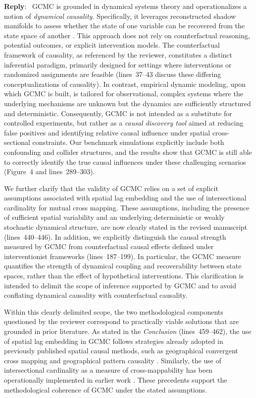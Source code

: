 \documentclass[11pt]{article}
\newcounter{reviewer}
\newenvironment{reply}
   {\medskip \noindent \color{blue} \begin{sf}\textbf{Reply}:\  }
   {\medskip \par \end{sf}}
\begin{document}
\begin{reply}
GCMC is grounded in dynamical systems theory and operationalizes a notion of \textit{dynamical causality}. Specifically, it leverages reconstructed shadow manifolds to assess whether the state of one variable can be recovered from the state space of another \citep{sugihara2012ccm,gao2023gccm,tao2023cmc}. This approach does not rely on counterfactual reasoning, potential outcomes, or explicit intervention models. The counterfactual framework of causality, as referenced by the reviewer, constitutes a distinct inferential paradigm, primarily designed for settings where interventions or randomized assignments are feasible (lines~37--43 discuss these differing conceptualizations of causality). In contrast, empirical dynamic modeling, upon which GCMC is built, is tailored for observational, complex systems where the underlying mechanisms are unknown but the dynamics are sufficiently structured and deterministic. Consequently, GCMC is not intended as a substitute for controlled experiments, but rather as a \textit{causal discovery tool} aimed at reducing false positives and identifying relative causal influence under spatial cross-sectional constraints. Our benchmark simulations explicitly include both confounding and collider structures, and the results show that GCMC is still able to correctly identify the true causal influences under these challenging scenarios (Figure~4 and lines~289--303).

We further clarify that the validity of GCMC relies on a set of explicit assumptions associated with spatial lag embedding and the use of intersectional cardinality for mutual cross mapping. These assumptions, including the presence of sufficient spatial variability and an underlying deterministic or weakly stochastic dynamical structure, are now clearly stated in the revised manuscript (lines~440--446). In addition, we explicitly distinguish the causal strength measured by GCMC from counterfactual causal effects defined under interventionist frameworks (lines~187--199). In particular, the GCMC measure quantifies the strength of dynamical coupling and recoverability between state spaces, rather than the effect of hypothetical interventions. This clarification is intended to delimit the scope of inference supported by GCMC and to avoid conflating dynamical causality with counterfactual causality.

Within this clearly delimited scope, the two methodological components questioned by the reviewer correspond to practically viable solutions that are grounded in prior literature. As stated in the \textit{Conclusion} (lines~459--462), the use of spatial lag embedding in GCMC follows strategies already adopted in previously published spatial causal methods, such as geographical convergent cross mapping and geographical pattern causality \citep{gao2023gccm,zhang2025gpc}. Similarly, the use of intersectional cardinality as a measure of cross-mappability has been operationally implemented in earlier work \citep{tao2023cmc}. These precedents support the methodological coherence of GCMC under the stated assumptions.


\end{reply}
\end{document}
